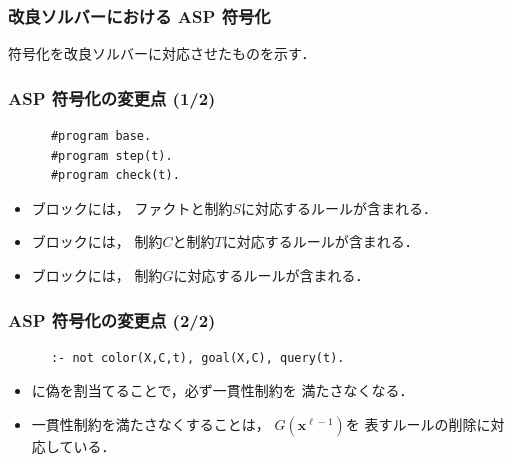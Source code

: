 \documentclass[dvipdfmx,11pt]{beamer}
\begin{document}
\begin{frame}\frametitle{改良ソルバーにおける ASP 符号化}

  符号化を改良ソルバーに対応させたものを示す．
  \begin{exampleblock}{}
    
  \end{exampleblock}
  
\end{frame}

\begin{frame}[fragile]\frametitle{ASP 符号化の変更点 (1/2)}


  \begin{exampleblock}{}
    \begin{lstlisting}
      #program base.
      #program step(t).
      #program check(t).
    \end{lstlisting}
  \end{exampleblock}
  \begin{itemize}
    \item {}ブロックには，
          ファクトと制約$S$に対応するルールが含まれる．
    \item {}ブロックには，
          制約$C$と制約$T$に対応するルールが含まれる．
    \item {}ブロックには，
          制約$G$に対応するルールが含まれる．
  \end{itemize}

\end{frame}

\begin{frame}[fragile]\frametitle{ASP 符号化の変更点 (2/2)}

  \begin{exampleblock}{}
    \begin{lstlisting}
      :- not color(X,C,t), goal(X,C), query(t).
    \end{lstlisting}
  \end{exampleblock}
  \begin{itemize}
    \item {}に偽を割当てることで，必ず一貫性制約を
          満たさなくなる．
    \item 一貫性制約を満たさなくすることは，
          $G(\bm{x}^{\ell -1})$を
          表すルールの削除に対応している．
  \end{itemize}
  
\end{frame}
\end{document}
